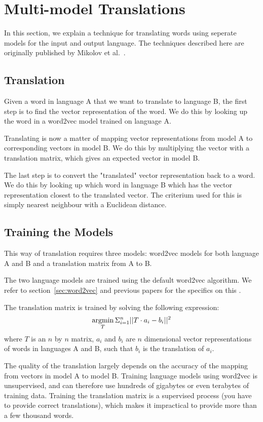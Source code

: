 \section{Multi-model Translations}
\label{sec:multi-model-translations}
In this section, we explain a technique for translating words using seperate models for the input and output language. The techniques described here are originally published by Mikolov et al.~\cite{mikolov2013exploiting}.

\subsection{Translation}
Given a word in language A that we want to translate to language B, the first step is to find the vector representation of the word. We do this by looking up the word in a word2vec model trained on language A.

Translating is now a matter of mapping vector representations from model A to corresponding vectors in model B. We do this by multiplying the vector with a translation matrix, which gives an expected vector in model B.

The last step is to convert the "translated" vector representation back to a word. We do this by looking up which word in language B which has the vector representation closest to the translated vector. The criterium used for this is simply nearest neighbour with a Euclidean distance.

\subsection{Training the Models}
This way of translation requires three models: word2vec models for both language A and B and a translation matrix from A to B.

The two language models are trained using the default word2vec algorithm. We refer to section~\ref{sec:word2vec} and previous papers for the specifics on this \cite{mikolov2013efficient, mikolov2013distributed}.

The translation matrix is trained by solving the following expression:
$$ \argmin_{T} \Sigma_{i=1}^{n} || T \cdot a_i - b_i || ^{2}$$
where $T$ is an $n$ by $n$ matrix, $a_i$ and $b_i$ are $n$ dimensional vector representations of words in languages A and B, such that $b_i$ is the translation of $a_i$.

The quality of the translation largely depends on the accuracy of the mapping from vectors in model A to model B. Training language models using word2vec is unsupervised, and can therefore use hundreds of gigabytes or even terabytes of training data. Training the translation matrix is a supervised process (you have to provide correct translations), which makes it impractical to provide more than a few thousand words.

